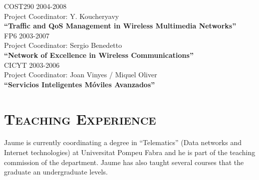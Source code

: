 \documentclass[line,margin]{res}
\begin{document}
\begin{resume}
\hfill {COST290 2004-2008} \\
Project Coordinator: Y. Koucheryavy\\
\textbf{``Traffic and QoS Management in Wireless Multimedia Networks''}\\

\hfill {FP6 2003-2007} \\
Project Coordinator: Sergio Benedetto\\
\textbf{``Network of Excellence in Wireless Communications''}\\

\hfill {CICYT 2003-2006} \\
Project Coordinator: Joan Vinyes / Miquel Oliver\\
\textbf{``Servicios Inteligentes Móviles Avanzados''}\\

\section{\textsc{Teaching Experience}}
Jaume is currently coordinating a degree in ``Telematics'' (Data networks and Internet technologies) at Universitat Pompeu Fabra and he is part of the teaching commission of the department. Jaume has also taught several courses that the graduate an undergraduate levels.


\end{resume}
\end{document}
